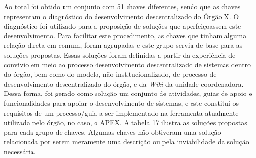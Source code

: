 Ao total foi obtido um conjunto com 51 chaves diferentes, sendo que as chaves representam o diagnóstico do desenvolvimento descentralizado do Órgão X. O diagnóstico foi utilizado para a proposição de soluções que aperfeiçoassem este desenvolvimento. Para facilitar este procedimento, as chaves que tinham alguma relação direta em comum, foram agrupadas e este grupo serviu de base para as soluções propostas. Essas soluções foram definidas a partir da experiência de convívio em meio ao processo desenvolvimento descentralizado de sistemas dentro do órgão, bem como do modelo, não institucionalizado, de processo de desenvolvimento descentralizado do órgão, e da \textit{Wiki} da unidade coordenadora. Dessa forma, foi gerado como solução um conjunto de atividades, guias de apoio e funcionalidades para apoiar o desenvolvimento de sistemas, e este constitui os requisitos de um processo/guia a ser implementado na ferramenta atualmente utilizada pelo órgão, no caso, o APEX. A tabela 17 ilustra as soluções propostas para cada grupo de chaves. Algumas chaves não obtiveram uma solução relacionada por serem meramente uma descrição ou pela inviabilidade da solução necessária. \clearpage

